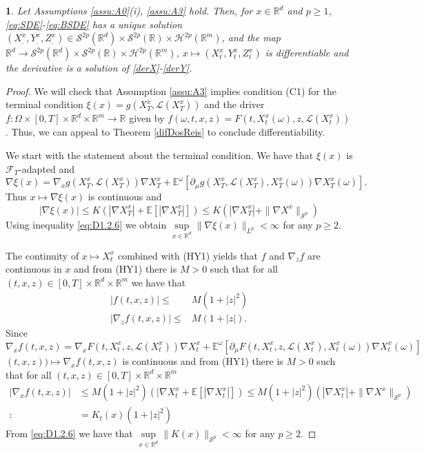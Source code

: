 \documentclass[12,english]{amsart}
\theoremstyle{plain}
\newtheorem{thm}{\protect\theoremname}
\theoremstyle{definition}
\theoremstyle{plain}
\theoremstyle{plain}
\theoremstyle{remark}
\providecommand{\theoremname}{Theorem}
\newcommand{\E}{\mathbb E}
\newcommand{\R}{\mathbb R}
\newcommand{\cF}{\mathcal F}
\newcommand{\cH}{\mathcal H}
\newcommand{\cL}{\mathcal L}
\newcommand{\cS}{\mathcal S}
\newcommand{\om}{\omega}
\newcommand{\Om}{\Omega}
\begin{document}
\begin{thm}\label{TFBSDE1}
  Let Assumptions \ref{assu:A0}(i), \ref{assu:A3} hold.
  Then, for $x\in\R^d$ and $p\geq1$, 
  \eqref{eq:SDE}-\eqref{eq:BSDE} has a unique solution
$(X_.^x,Y_.^x,Z_.^x)\in\cS^{2p}(\R^d)\times\cS^{2p}(\R)\times\cH^{2p}(\R^m)$,
and the map $\R^d\to\cS^{2p}(\R^d)\times\cS^{2p}(\R)\times\cH^{2p}(\R^m)$,
$x\mapsto(X_t^x,Y_t^x,Z_t^x)$ is differentiable and the derivative is a solution of 
\eqref{derX}-\eqref{derY}.
\end{thm}
\begin{proof}
  
We will check that Assumption \ref{assu:A3} implies condition
(C1) for the terminal condition $\xi(x)=g(X^x_T, \cL(X^x_T))$ and
the driver $f:\Om\times[0,T]\times\R^d\times\R^m\to\R$ given
by $f(\om,t,x,z)=F(t,X_t^x(\om),z,\cL(X^x_t))$. Thus, we can appeal to
Theorem \ref{difDosReis} to conclude differentiability.

We start with the statement about the terminal condition.
We have that $\xi(x)$ is $\cF_T$-adapted and 
\[\nabla\xi(x)=\nabla_xg(X^x_T,\cL(X^x_T)) \nabla X^x_T+\E^\om[\partial_\mu g(X^x_T,\cL(X^x_T), X^x_T(\om))\nabla X^x_T(\om)].\]
Thus $x\mapsto\nabla\xi(x)$ is continuous and
\[|\nabla\xi(x)|\le K (|\nabla X^x_T|+\E[|\nabla X^x_T|])\le K (|\nabla X^x_T|+\|\nabla X^x\|_{\cS^p})\]
Using inequality \eqref{eq:D1.2.6} we obtain
$\sup\limits_{x\in\R^d}\|\nabla\xi(x)\|_{L^p}<\infty$ for any $p\ge 2$.

The continuity of
$x\mapsto X_t^x$ combined with (HY1) yields that $f$
and $\nabla_zf$ are continuous in $x$ and from (HY1) there is $M>0$ such that
for all $(t,x,z)\in[0,T]\times\R^d\times\R^m$ we have that
\begin{align*}
  |f(t,x,z)|\leq & M(1+|z|^2)\\
|\nabla_zf(t,x,z)|\leq & M(1+|z|).
\end{align*}
 Since
\[\nabla_xf(t,x,z)=\nabla_xF(t,X^x_t,z,\cL(X^x_t))\nabla X^x_t+
  \E^\om[\partial_\mu F(t,X^x_t,z,\cL(X^x_t), X^x_t(\om))\nabla X^x_t(\om)]\]
$(t,x,z))\mapsto\nabla_xf(t,x,z)$ is continuous and from (HY1) there is $M>0$ such that  
for all $(t,x,z)\in[0,T]\times\R^d\times\R^m$ 
\begin{align*}
  |\nabla_xf(t,x,z)|&\le M(1+|z|^2) (|\nabla X^x_t+\E[|\nabla X^x_t|])
                   \le M(1+|z|^2) (|\nabla X^x_t|+\|\nabla X^x\|_{\cS^p})\\
                 :& =K_t(x)(1+|z|^2) 
\end{align*}
  From \eqref{eq:D1.2.6}  we have that $\sup\limits_{x\in\R^d}\|K(x)\|_{\cS^p}<\infty$
for any $p\ge 2$.
\end{proof}
\end{document}
